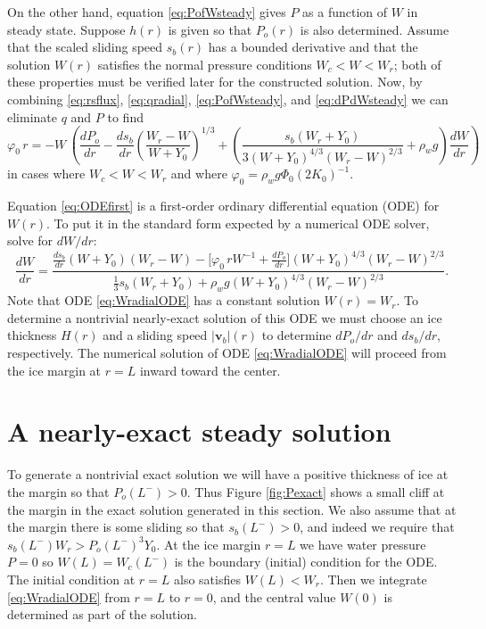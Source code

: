 \documentclass[11pt,final]{amsart}%
\newcommand\bv{\mathbf{v}}
\begin{document}
On the other hand, equation \eqref{eq:PofWsteady} gives $P$ as a function of $W$ in steady state.  Suppose $h(r)$ is given so that $P_o(r)$ is also determined.  Assume that the scaled sliding speed $s_b(r)$ has a bounded derivative and that the solution $W(r)$ satisfies the normal pressure conditions $W_c < W < W_r$; both of these properties must be verified later for the constructed solution.  Now, by combining \eqref{eq:rsflux}, \eqref{eq:qradial}, \eqref{eq:PofWsteady}, and \eqref{eq:dPdWsteady} we can eliminate $q$ and $P$ to find
\begin{equation}
\varphi_0\, r = - W\, \left(\frac{dP_o}{dr} - \frac{ds_b}{dr} \left(\frac{W_r - W}{W+Y_0}\right)^{1/3} + \left(\frac{s_b (W_r + Y_0)}{3 (W+Y_0)^{4/3} (W_r - W)^{2/3}} + \rho_w g\right) \frac{dW}{dr}\right)  \label{eq:ODEfirst}
\end{equation}
in cases where $W_c < W < W_r$ and where $\varphi_0 = \rho_w g \Phi_0 (2 K_0)^{-1}$. 

Equation \eqref{eq:ODEfirst} is a first-order ordinary differential equation (ODE) for $W(r)$.  To put it in the standard form expected by a numerical ODE solver, solve for $dW/dr$:
\begin{equation}
\frac{dW}{dr} = \frac{\frac{ds_b}{dr} (W+Y_0) (W_r - W) - \Big[\varphi_0\, r W^{-1} + \frac{dP_o}{dr}\Big] (W + Y_0)^{4/3} \left(W_r - W\right)^{2/3}}{\frac{1}{3} s_b (W_r + Y_0) + \rho_w g (W + Y_0)^{4/3} (W_r - W)^{2/3}}.
\label{eq:WradialODE}
\end{equation}
Note that ODE \eqref{eq:WradialODE} has a constant solution $W(r)=W_r$.  To determine a nontrivial nearly-exact solution of this ODE we must choose an ice thickness $H(r)$ and a sliding speed $|\bv_b|(r)$ to determine $dP_o/dr$ and $ds_b/dr$, respectively.  The numerical solution of ODE \eqref{eq:WradialODE} will proceed from the ice margin at $r=L$ inward toward the center.


\section{A nearly-exact steady solution}

To generate a nontrivial exact solution we will have a positive thickness of ice at the margin so that $P_o(L^-)>0$.  Thus Figure \ref{fig:Pexact} shows a small cliff at the margin in the exact solution generated in this section.  We also assume that at the margin there is some sliding so that $s_b(L^-)>0$, and indeed we require that $s_b(L^-) W_r > P_o(L^-)^3 Y_0$.  At the ice margin $r=L$ we have water pressure $P=0$ so $W(L)=W_c(L^-)$ is the boundary (initial) condition for the ODE.  The initial condition at $r=L$ also satisfies $W(L) < W_r$.  Then we integrate \eqref{eq:WradialODE} from $r=L$ to $r=0$, and the central value $W(0)$ is determined as part of the solution.
\end{document}
